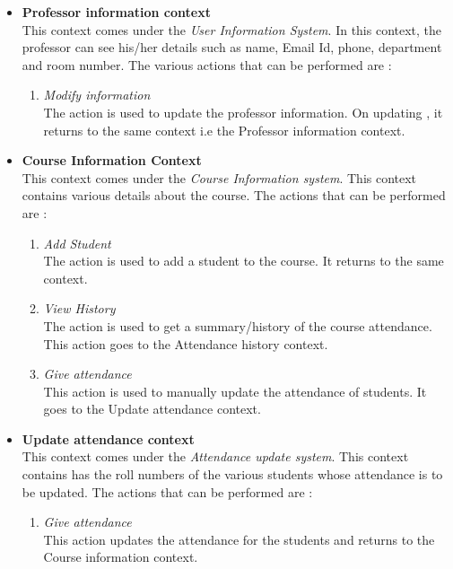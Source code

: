 \documentclass[paper=a4, fontsize=15pt]{scrartcl}
\begin{document}
\begin{itemize}
    \item \textbf{Professor information context}\\
    This context comes under the \textit{User Information System}. In this context, the professor can see his/her details such as name, Email Id, phone, department and room number. The various actions that can be performed are : 
    \begin{enumerate}
        \item \textit{Modify information}\\
        The action is used to update the professor information. On updating , it returns to the same context i.e the Professor information context.
        
    \end{enumerate}
    
    \item \textbf{Course Information Context}\\
    This context comes under the \textit{Course Information system}. This context contains various details about the course. The actions that can be performed are :
    \begin{enumerate}
        \item \textit{Add Student}\\
        The action is used to add a student to the course. It returns to the same context.
        \item \textit{View History}\\
        The action is used to get a summary/history of the course attendance. This action goes to the Attendance history context.
        \item \textit{Give attendance}\\
        This action is used to manually update the attendance of students. It goes to the Update attendance context.
    \end{enumerate}
        
   \item \textbf{Update attendance context}\\
   This context comes under the \textit{Attendance update system}.
   This context contains has the roll numbers of the various students whose attendance is to be updated.
   The actions that can be performed are :
   \begin{enumerate}
       \item \textit{Give attendance}\\
       This action updates the attendance for the students and returns to the Course information context.
   \end{enumerate}
   

\end{itemize}
\end{document}
